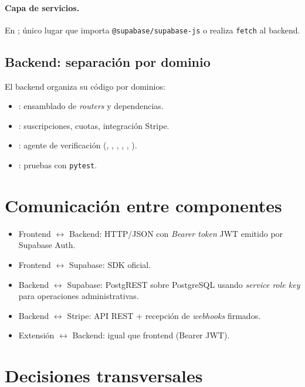 \paragraph{Capa de servicios.} En ; único lugar que
importa \texttt{@supabase/supabase-js} o realiza \texttt{fetch} al
backend.

\subsection{Backend: separación por dominio}

El backend organiza su código por dominios:
\begin{itemize}[leftmargin=*,itemsep=0.2em]
  \item {}: ensamblado de \emph{routers} y dependencias.
  \item {}: suscripciones, cuotas, integración Stripe.
  \item {}: agente de verificación
        (, ,
        , ,
        , ).
  \item {}: pruebas con \texttt{pytest}.
\end{itemize}

\section{Comunicación entre componentes}

\begin{itemize}[leftmargin=*,itemsep=0.2em]
  \item Frontend $\leftrightarrow$ Backend: HTTP/JSON con \emph{Bearer
        token} JWT emitido por Supabase Auth.
  \item Frontend $\leftrightarrow$ Supabase: SDK oficial.
  \item Backend $\leftrightarrow$ Supabase: PostgREST sobre PostgreSQL
        usando \emph{service role key} para operaciones administrativas.
  \item Backend $\leftrightarrow$ Stripe: API REST + recepción de
        \emph{webhooks} firmados.
  \item Extensión $\leftrightarrow$ Backend: igual que frontend
        (Bearer JWT).
\end{itemize}

\section{Decisiones transversales}

